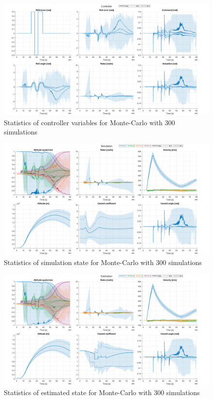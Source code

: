 \begin{figure}[ht]
    \centering
    \includegraphics[width=\linewidth]{images-results/result_stats_control_fixaccel_300.png}
    \caption{Statistics of controller variables for Monte-Carlo with 300 simulations}
    \label{fig:results_mc_stat_control}
\end{figure}
\begin{figure}[ht]
    \centering
    \includegraphics[width=\linewidth]{images-results/result_stats_sim_fixaccel_300.png}
    \caption{Statistics of simulation state for Monte-Carlo with 300 simulations}
    \label{fig:results_mc_stat_sim}
\end{figure}
\begin{figure}[ht]
    \centering
    \includegraphics[width=\linewidth]{images-results/result_stats_est_fixaccel_300.png}
    \caption{Statistics of estimated state for Monte-Carlo with 300 simulations}
    \label{fig:results_mc_stat_est}
\end{figure}
